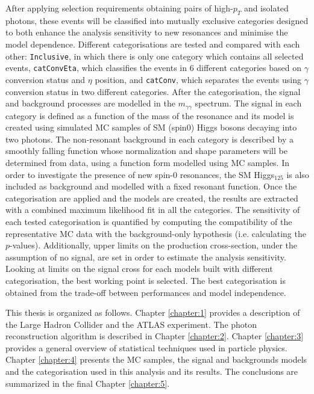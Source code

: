 \documentclass[a4paper, oneside, 11pt, openright]{book}
\begin{document}
		After applying selection requirements obtaining pairs of high-$p_T$ and isolated photons, these events will be classified into mutually exclusive categories designed to both enhance the analysis sensitivity to new resonances and minimise the model dependence. Different categorisations are tested and compared with each other:  \texttt{Inclusive}, in which there is only one category which contains all selected events, \texttt{catConvEta}, which classifies the events in 6 different categories based on $\gamma$ conversion status and $\eta$ position, and \texttt{catConv}, which separates the events using $\gamma$ conversion status in two different categories. After the categorisation, the signal and background processes are modelled in the $m_{\gamma\gamma}$ spectrum. The signal in each category is defined as a function of the mass of the resonance and its model is created using simulated MC samples of SM (spin0) Higgs bosons decaying into two photons. The non-resonant background in each category is described by a smoothly falling function whose normalization and shape parameters will be determined from data, using a function form modelled using MC samples. In order to investigate the presence of new spin-0 resonances, the SM Higgs$_{125}$ is also included as background and modelled with a fixed resonant function. Once the categorisation are applied and the models are created, the results are extracted with a combined maximum likelihood fit in all the categories. The sensitivity of each tested categorisation is quantified by computing the compatibility of the representative MC data with the background-only hypothesis (i.e. calculating the $p$-values). Additionally, upper limits on the production cross-section, under the assumption of no signal, are set in order to estimate the analysis sensitivity. Looking at limits on the signal cross for each models built with different categorisation, the best working point is selected. The best categorisation is obtained from the trade-off between performances and model independence.
		
		This thesis is organized as follows. Chapter \ref{chapter:1} provides a description of the Large Hadron Collider and the ATLAS experiment. The photon reconstruction algorithm is described in Chapter \ref{chapter:2}. Chapter \ref{chapter:3} provides a general overview of statistical techniques used in particle physics. Chapter \ref{chapter:4} presents the MC samples, the signal and backgrounds models and the categorisation used in this analysis and its results. The conclusions are summarized in the final Chapter \ref{chapter:5}.
	
\end{document}
